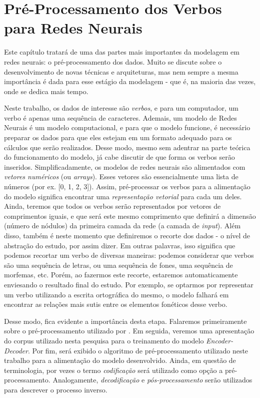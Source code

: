 \chapter{Pré-Processamento dos Verbos para Redes Neurais}
\label{ch:02}

Este capítulo tratará de uma das partes mais importantes da modelagem em redes neurais: o pré-processamento dos dados. Muito se discute sobre o desenvolvimento de novas técnicas e arquiteturas, mas nem sempre a mesma importância é dada para esse estágio da modelagem - que é, na maioria das vezes, onde se dedica mais tempo. 

Neste trabalho, os dados de interesse são \textit{verbos}, e para um computador, um verbo é apenas uma sequência de caracteres. Ademais, um modelo de Redes Neurais é um modelo computacional, e para que o modelo funcione, é necessário preparar os dados para que eles estejam em um formato adequado para os cálculos que serão realizados. Desse modo, mesmo sem adentrar na parte teórica do funcionamento do modelo, já cabe discutir de que forma os verbos serão inseridos. Simplificadamente, os modelos de redes neurais são alimentados com \textit{vetores numéricos} (ou \textit{arrays}). Esses vetores são essencialmente uma lista de números (por ex. [0, 1, 2, 3]). Assim, pré-processar os verbos para a alimentação do modelo significa encontrar uma \textit{representação vetorial} para cada um deles. Ainda, teremos que todos os verbos serão representados por vetores de comprimentos iguais, e que será este mesmo comprimento que definirá a dimensão (número de nódulos) da primeira camada da rede (a camada de \textit{input}). Além disso, também é neste momento que definiremos o recorte dos dados - o nível de abstração do estudo, por assim dizer. Em outras palavras, isso significa que podemos recortar um verbo de diversas maneiras: podemos considerar que verbos são uma sequência de letras, ou uma sequência de fones, uma sequência de morfemas, etc. Porém, ao fazermos este recorte, estaremos automaticamente enviesando o resultado final do estudo. Por exemplo, se optarmos por representar um verbo utilizando a escrita ortográfica do mesmo, o modelo falhará em encontrar as relações mais sutis entre os elementos fonéticos desse verbo.

Desse modo, fica evidente a importância desta etapa. Falaremos primeiramente sobre o pré-processamento utilizado por \cite{rumelhart:1986}. Em seguida, veremos uma apresentação do corpus utilizado nesta pesquisa para o treinamento do modelo \textit{Encoder-Decoder}. Por fim, será exibido o algoritmo de pré-processamento utilizado neste trabalho para a alimentação do modelo desenvolvido. Ainda, em questão de terminologia, por vezes o termo \textit{codificação} será utilizado como opção a pré-processamento. Analogamente, \textit{decodificação} e \textit{pós-processamento} serão utilizados para descrever o processo inverso. 

